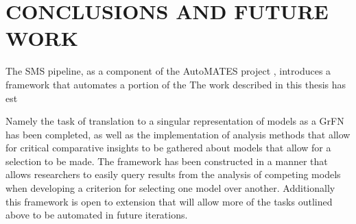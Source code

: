 \chapter{CONCLUSIONS AND FUTURE WORK\label{chapter:conc_and_future}}




The SMS pipeline, as a component of the AutoMATES project \citep{pyarelal2019}, introduces a framework that automates a portion of the
The work described in this thesis has est

Namely the task of translation to a singular representation of models as a GrFN has been completed, as well as the implementation of analysis methods that allow for critical comparative insights to be gathered about models that allow for a selection to be made.
The framework has been constructed in a manner that allows researchers to easily query results from the analysis of competing models when developing a criterion for selecting one model over another.
Additionally this framework is open to extension that will allow more of the tasks outlined above to be automated in future iterations.

